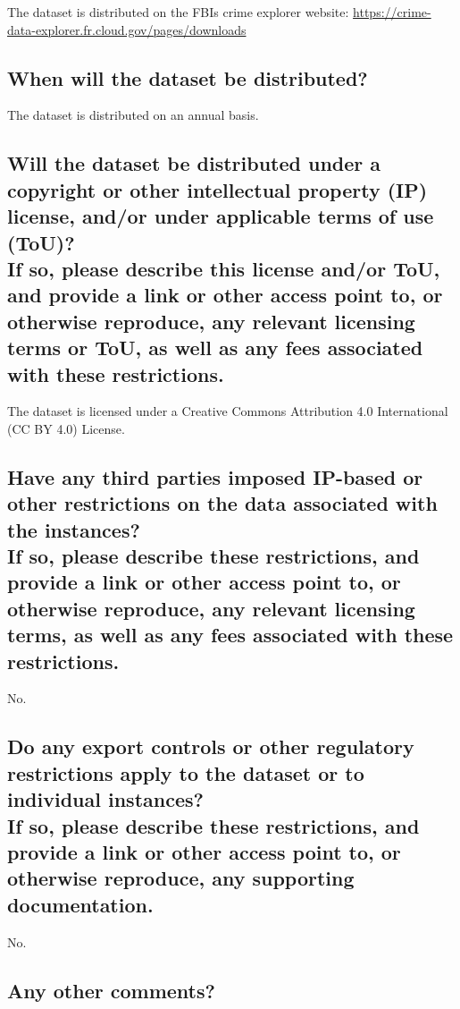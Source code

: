 \documentclass[letterpaper, 10 pt, conference]{ieeeconf}  %
\newcommand{\subtitle}[1]{{\\ \small \normalfont \color{purple} #1}}
\begin{document}
The dataset is distributed on the FBIs crime explorer website: \href{https://crime-data-explorer.fr.cloud.gov/pages/downloads}{https://crime-data-explorer.fr.cloud.gov/pages/downloads}

\subsection{When will the dataset be distributed?}

The dataset is distributed on an annual basis.

\subsection{Will the dataset be distributed under a copyright or other intellectual property (IP) license, and/or under applicable terms of use (ToU)? \subtitle{If so, please describe this license and/or ToU, and provide a link or other access point to, or otherwise reproduce, any relevant licensing terms or ToU, as well as any fees associated with these restrictions.}}

The dataset is licensed under a Creative Commons Attribution 4.0 International (CC BY 4.0) License.

\subsection{Have any third parties imposed IP-based or other restrictions on the data associated with the instances? \subtitle{If so, please describe these restrictions, and provide a link or other access point to, or otherwise reproduce, any relevant licensing terms, as well as any fees associated with these restrictions.}}

No.

\subsection{Do any export controls or other regulatory restrictions apply to the dataset or to individual instances? \subtitle{If so, please describe these restrictions, and provide a link or other access point to, or otherwise reproduce, any supporting documentation.}}

No.

\subsection{Any other comments?}
\end{document}
